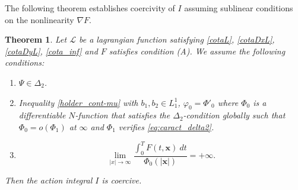 \documentclass[twoside]{article}
\newtheorem{thm}{Theorem}[section]
\theoremstyle{remark}
\renewcommand{\b}[1]{\boldsymbol{#1}}
\begin{document}
The following theorem establishes  coercivity of $I$ assuming sublinear conditions on the nonlinearity  $\nabla F$. 












\begin{thm}\label{coercitividad-r}
Let  $\mathcal{L}$ be a lagrangian function satisfying \eqref{cotaL}, \eqref{cotaDxL}, \eqref{cotaDyL}, \eqref{cota_inf}  and $F$ satisfies condition (A). We assume the following conditions:
\begin{enumerate}
\item $\Psi\in\Delta_2$.
\item Inequality \eqref{holder_cont-mu} with $b_1,b_2 \in L^1_1$,  $\varphi_0=\Phi'_0$ where $\Phi_0$ is a differentiable $N$-function that satisfies the $\Delta_2$-condition globally such that
$\Phi_0=o(\Phi_1)$ at $\infty$ and $\Phi_1$ verifies \eqref{eq:caract_delta2}.
\item 
\begin{equation}\label{eq:propiedad-coercividad-phi0}
\lim_{|x|\to\infty}\frac{\int_{0}^{T}F(t,\b{x})\ dt}{\Phi_0(|\b{x}|)}=+\infty.
\end{equation}
\end{enumerate}
Then  the action integral $I$ is coercive.
\end{thm}
\end{document}
